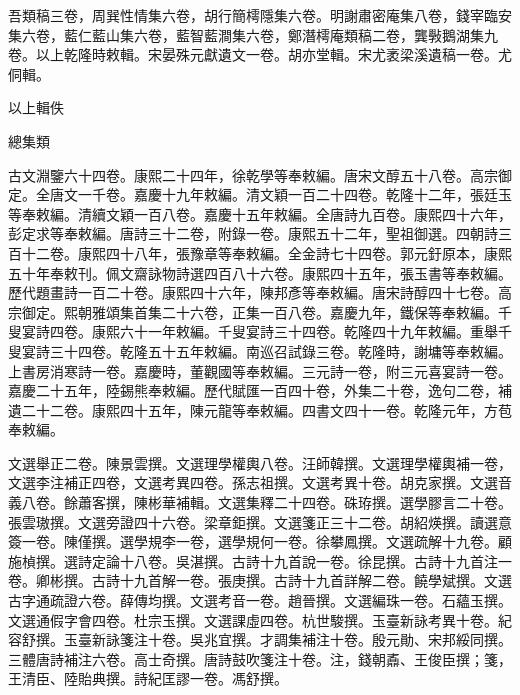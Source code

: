 \begin{pinyinscope}
吾類稿三卷，周巽性情集六卷，胡行簡樗隱集六卷。明謝肅密庵集八卷，錢宰臨安集六卷，藍仁藍山集六卷，藍智藍澗集六卷，鄭潛樗庵類稿二卷，龔斅鵝湖集九卷。以上乾隆時敕輯。宋晏殊元獻遺文一卷。胡亦堂輯。宋尤袤梁溪遺稿一卷。尤侗輯。

以上輯佚

總集類

古文淵鑒六十四卷。康熙二十四年，徐乾學等奉敕編。唐宋文醇五十八卷。高宗御定。全唐文一千卷。嘉慶十九年敕編。清文穎一百二十四卷。乾隆十二年，張廷玉等奉敕編。清續文穎一百八卷。嘉慶十五年敕編。全唐詩九百卷。康熙四十六年，彭定求等奉敕編。唐詩三十二卷，附錄一卷。康熙五十二年，聖祖御選。四朝詩三百十二卷。康熙四十八年，張豫章等奉敕編。全金詩七十四卷。郭元釪原本，康熙五十年奉敕刊。佩文齋詠物詩選四百八十六卷。康熙四十五年，張玉書等奉敕編。歷代題畫詩一百二十卷。康熙四十六年，陳邦彥等奉敕編。唐宋詩醇四十七卷。高宗御定。熙朝雅頌集首集二十六卷，正集一百八卷。嘉慶九年，鐵保等奉敕編。千叟宴詩四卷。康熙六十一年敕編。千叟宴詩三十四卷。乾隆四十九年敕編。重舉千叟宴詩三十四卷。乾隆五十五年敕編。南巡召試錄三卷。乾隆時，謝墉等奉敕編。上書房消寒詩一卷。嘉慶時，董觀國等奉敕編。三元詩一卷，附三元喜宴詩一卷。嘉慶二十五年，陸錫熊奉敕編。歷代賦匯一百四十卷，外集二十卷，逸句二卷，補遺二十二卷。康熙四十五年，陳元龍等奉敕編。四書文四十一卷。乾隆元年，方苞奉敕編。

文選舉正二卷。陳景雲撰。文選理學權輿八卷。汪師韓撰。文選理學權輿補一卷，文選李注補正四卷，文選考異四卷。孫志祖撰。文選考異十卷。胡克家撰。文選音義八卷。餘蕭客撰，陳彬華補輯。文選集釋二十四卷。硃珔撰。選學膠言二十卷。張雲璈撰。文選旁證四十六卷。梁章鉅撰。文選箋正三十二卷。胡紹煐撰。讀選意簽一卷。陳僅撰。選學規李一卷，選學規何一卷。徐攀鳳撰。文選疏解十九卷。顧施楨撰。選詩定論十八卷。吳湛撰。古詩十九首說一卷。徐昆撰。古詩十九首注一卷。卿彬撰。古詩十九首解一卷。張庚撰。古詩十九首詳解二卷。饒學斌撰。文選古字通疏證六卷。薛傳均撰。文選考音一卷。趙晉撰。文選編珠一卷。石蘊玉撰。文選通假字會四卷。杜宗玉撰。文選課虛四卷。杭世駿撰。玉臺新詠考異十卷。紀容舒撰。玉臺新詠箋注十卷。吳兆宜撰。才調集補注十卷。殷元勛、宋邦綏同撰。三體唐詩補注六卷。高士奇撰。唐詩鼓吹箋注十卷。注，錢朝鼒、王俊臣撰；箋，王清臣、陸貽典撰。詩紀匡謬一卷。馮舒撰。


\end{pinyinscope}
